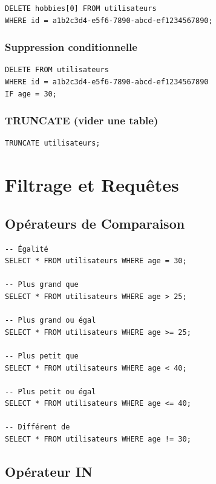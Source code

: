\documentclass[11pt,a4paper]{article}
\begin{document}
\begin{lstlisting}
DELETE hobbies[0] FROM utilisateurs
WHERE id = a1b2c3d4-e5f6-7890-abcd-ef1234567890;
\end{lstlisting}

\subsubsection{Suppression conditionnelle}

\begin{lstlisting}
DELETE FROM utilisateurs
WHERE id = a1b2c3d4-e5f6-7890-abcd-ef1234567890
IF age = 30;
\end{lstlisting}

\subsubsection{TRUNCATE (vider une table)}

\begin{lstlisting}
TRUNCATE utilisateurs;
\end{lstlisting}

\newpage

\section{Filtrage et Requêtes}

\subsection{Opérateurs de Comparaison}

\begin{lstlisting}
-- Égalité
SELECT * FROM utilisateurs WHERE age = 30;

-- Plus grand que
SELECT * FROM utilisateurs WHERE age > 25;

-- Plus grand ou égal
SELECT * FROM utilisateurs WHERE age >= 25;

-- Plus petit que
SELECT * FROM utilisateurs WHERE age < 40;

-- Plus petit ou égal
SELECT * FROM utilisateurs WHERE age <= 40;

-- Différent de
SELECT * FROM utilisateurs WHERE age != 30;
\end{lstlisting}

\subsection{Opérateur IN}
\end{document}
